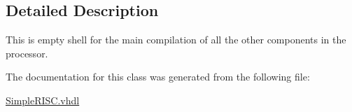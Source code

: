 \subsection{Detailed Description}
This is empty shell for the main compilation of all the other components in the processor. 

The documentation for this class was generated from the following file\-:\begin{DoxyCompactItemize}
\item 
\hyperlink{_simple_r_i_s_c_8vhdl}{Simple\-R\-I\-S\-C.\-vhdl}\end{DoxyCompactItemize}
